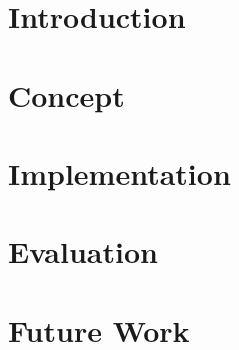 \chapter{Introduction}


\chapter{Concept}


\chapter{Implementation}


\chapter{Evaluation}


\chapter{Future Work}


\nocite{*}
